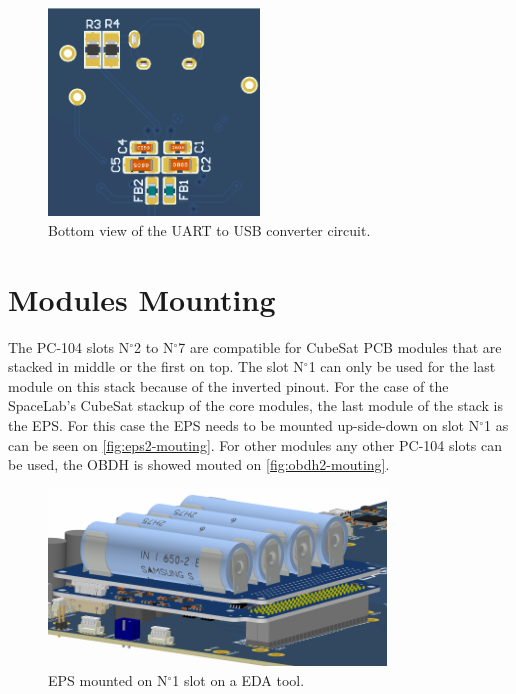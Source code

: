 \begin{figure}[!ht]
    \begin{center}
        \includegraphics[width=0.5\textwidth]{figures/ft4232h_circuit_bottom.png}
        \caption{Bottom view of the UART to USB converter circuit.}
        \label{fig:R4-pad}
    \end{center}
\end{figure}

\section{Modules Mounting}

The PC-104 slots N$^{\circ}$2 to N$^{\circ}$7 are compatible for CubeSat PCB modules that are stacked in middle or the first on top. The slot N$^{\circ}$1 can only be used for the last module on this stack because of the inverted pinout. For the case of the SpaceLab's CubeSat stackup of the core modules, the last module of the stack is the EPS. For this case the EPS needs to be mounted up-side-down on slot N$^{\circ}$1 as can be seen on \autoref{fig:eps2-mouting}. For other modules any other PC-104 slots can be used, the OBDH is showed mouted on \autoref{fig:obdh2-mouting}.

\begin{figure}[!ht]
    \begin{center}
        \includegraphics[width=0.8\textwidth]{figures/eps2_mouting.png}
        \caption{EPS mounted on N$^{\circ}$1 slot on a EDA tool.}
        \label{fig:eps2-mouting}
    \end{center}
\end{figure}

